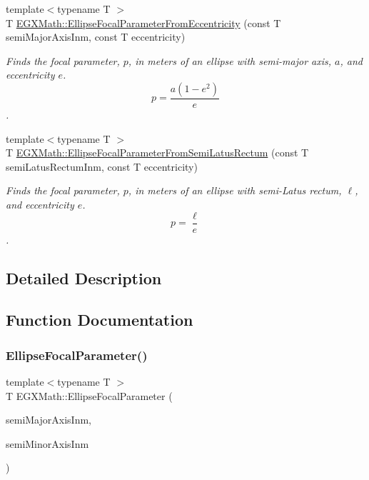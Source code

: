 \begin{DoxyCompactItemize}
{\footnotesize template$<$typename T $>$ }\\T \mbox{\hyperlink{group___e_g_x_math-_geometry-2_d-_ellipse-_focal_parameter_gafd838410a3f813315166c64b53e0e25b}{E\+G\+X\+Math\+::\+Ellipse\+Focal\+Parameter\+From\+Eccentricity}} (const T semi\+Major\+Axis\+Inm, const T eccentricity)
\begin{DoxyCompactList}\small\item\em Finds the focal parameter, $p$, in meters of an ellipse with semi-\/major axis, $a$, and eccentricity $e$. \[ p=\frac{a(1-e^2)}{e} \]. \end{DoxyCompactList}\item 
{\footnotesize template$<$typename T $>$ }\\T \mbox{\hyperlink{group___e_g_x_math-_geometry-2_d-_ellipse-_focal_parameter_gaf957cf9131d3998bfe944f6234a133e6}{E\+G\+X\+Math\+::\+Ellipse\+Focal\+Parameter\+From\+Semi\+Latus\+Rectum}} (const T semi\+Latus\+Rectum\+Inm, const T eccentricity)
\begin{DoxyCompactList}\small\item\em Finds the focal parameter, $p$, in meters of an ellipse with semi-\/\+Latus rectum, $\ell$, and eccentricity $e$. \[ p=\frac{\ell}{e} \]. \end{DoxyCompactList}\end{DoxyCompactItemize}


\subsection{Detailed Description}


\subsection{Function Documentation}
\mbox{\label{group___e_g_x_math-_geometry-2_d-_ellipse-_focal_parameter_ga4cd01a38c72c092ef9791351948bf69b}} 
\subsubsection{\texorpdfstring{Ellipse\+Focal\+Parameter()}{EllipseFocalParameter()}}
{\footnotesize\ttfamily template$<$typename T $>$ \\
T E\+G\+X\+Math\+::\+Ellipse\+Focal\+Parameter (\begin{DoxyParamCaption}\item[{const T}]{semi\+Major\+Axis\+Inm,  }\item[{const T}]{semi\+Minor\+Axis\+Inm }\end{DoxyParamCaption})}



